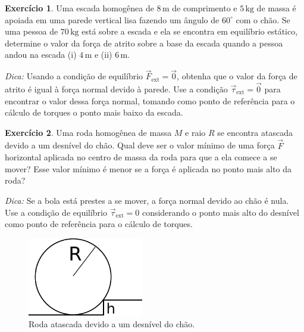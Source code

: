 \documentclass[twocolumn=on,fontsize=12pt,DIV=calc]{scrartcl}
\theoremstyle{definition}
\newtheorem{ex}{Exercício}[section]
\begin{document}
\begin{ex}
  Uma escada homogênea de $8\,\mathrm{m}$ de comprimento e
  $5\,\mathrm{kg}$ de massa é apoiada em uma parede vertical lisa
  fazendo um ângulo de $60^\circ$ com o chão. Se uma pessoa de
  $70\,\mathrm{kg}$ está sobre a escada e ela se encontra em
  equilíbrio estático, determine o valor da força de atrito sobre a
  base da escada quando a pessoa andou na escada (i) $4\,\mathrm{m}$ e
  (ii) $6\,\mathrm{m}$.

  \noindent\textit{Dica:} Usando a condição de equilíbrio $\vec F_{\textrm{ext}}=\vec 0$, obtenha
  que o valor da força de atrito é igual à força normal devido à
  parede. Use a condição $\vec\tau_\textrm{ext}=\vec 0$ para encontrar o
  valor dessa força normal, tomando como ponto de referência para o
  cálculo de torques o ponto mais baixo da escada.
\end{ex}

\begin{ex}
  Uma roda homogênea de massa $M$ e raio $R$ se encontra atascada
  devido a um desnível do chão. Qual deve ser o valor mínimo de uma
  força $\vec F$ horizontal aplicada no centro de massa da roda para
  que a ela comece a se mover? Esse valor mínimo é menor se a força é
  aplicada no ponto mais alto da roda?

  \noindent\textit{Dica:} Se a bola está prestes a se mover, a força
  normal devido ao chão é nula. Use a condição de equilíbrio
  $\vec\tau_{\mathrm{ext}}=0$ considerando o ponto mais alto do
  desnível como ponto de referência para o cálculo de torques.
  \begin{figure}[ht]
    \centering
    \includegraphics[width=0.45\textwidth,keepaspectratio]{aux/roda_obstaculo.pdf}
    \caption{Roda atascada devido a um desnível do chão.}
    \label{fig:roda_obstaculo}
  \end{figure}
\end{ex}
\end{document}
